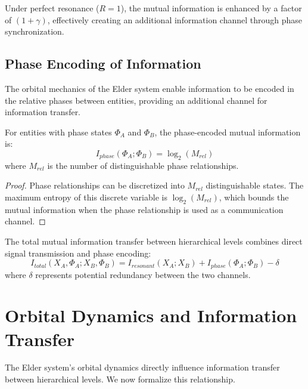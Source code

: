 \begin{corollary}
Under perfect resonance ($R = 1$), the mutual information is enhanced by a factor of $(1 + \gamma)$, effectively creating an additional information channel through phase synchronization.
\end{corollary}

\subsection{Phase Encoding of Information}

The orbital mechanics of the Elder system enable information to be encoded in the relative phases between entities, providing an additional channel for information transfer.

\begin{theorem}
For entities with phase states $\Phi_A$ and $\Phi_B$, the phase-encoded mutual information is:
\begin{equation}
I_{phase}(\Phi_A; \Phi_B) = \log_2(M_{rel})
\end{equation}
where $M_{rel}$ is the number of distinguishable phase relationships.
\end{theorem}

\begin{proof}
Phase relationships can be discretized into $M_{rel}$ distinguishable states. The maximum entropy of this discrete variable is $\log_2(M_{rel})$, which bounds the mutual information when the phase relationship is used as a communication channel.
\end{proof}

\begin{theorem}
The total mutual information transfer between hierarchical levels combines direct signal transmission and phase encoding:
\begin{equation}
I_{total}(X_A, \Phi_A; X_B, \Phi_B) = I_{resonant}(X_A; X_B) + I_{phase}(\Phi_A; \Phi_B) - \delta
\end{equation}
where $\delta$ represents potential redundancy between the two channels.
\end{theorem}

\section{Orbital Dynamics and Information Transfer}

The Elder system's orbital dynamics directly influence information transfer between hierarchical levels. We now formalize this relationship.

